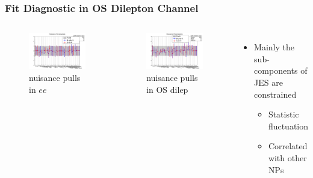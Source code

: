 \documentclass{beamer}
\begin{document}

\begin{frame}
\frametitle{Fit Diagnostic in OS Dilepton Channel}
\vspace{-10pt}
\begin{columns}
	\begin{figure}
		\includegraphics[scale=0.15]{elelNP.png}
		\vspace{-10pt} \caption{nuisance pulls in $ee$}
	\end{figure}
	\vspace{-20pt}
	\begin{figure}
		\includegraphics[scale=0.15]{combNP.png}
		\vspace{-10pt} \caption{nuisance pulls in OS dilep}
	\end{figure}
	\begin{itemize}
		\item Mainly the sub-components of JES are constrained 
		\begin{itemize} 
			\item Statistic fluctuation
			\item Correlated with other NPs
		\end{itemize}
	\end{itemize}
\end{columns}
\end{frame}
\end{document}
